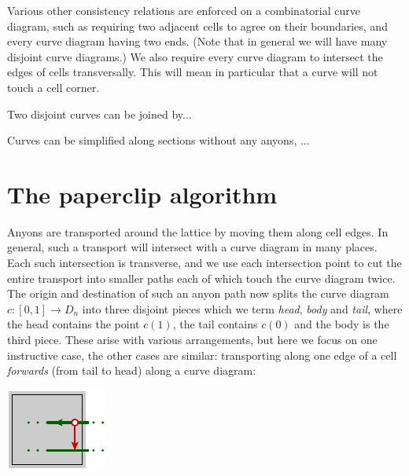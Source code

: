 \documentclass[aps, prl, letterpaper, twocolumn, superscriptaddress, notitlepage, 10pt]{revtex4-1}
\begin{document}
Various other consistency relations are enforced on a combinatorial curve diagram,
such as requiring two
adjacent cells to agree on their boundaries, and every curve diagram
having two ends.
(Note that in general we will have many disjoint curve diagrams.)
We also require every curve diagram to intersect 
the edges of cells transversally.
This will mean in particular that a curve will not touch a cell corner.

Two disjoint curves can be joined by...

Curves can be simplified along sections without any anyons, ...



\section{The paperclip algorithm}

Anyons are transported around the lattice
by moving them along cell edges.
In general, such a transport will intersect with a
curve diagram in many places.
Each such intersection is transverse,
and we use each intersection point to cut
the entire transport into smaller paths each of
which touch the curve diagram twice.
The origin and destination of such an anyon path
now splits the curve diagram $c:[0, 1]\to D_n$ 
into three disjoint pieces which we term
\emph{head}, \emph{body} and \emph{tail}, where
the head contains the point $c(1)$, the tail
contains $c(0)$ and the body is the third piece.
These arise with various arrangements, but here
we focus on one instructive case, the
other cases are similar:
transporting along one edge of a cell \emph{forwards} 
(from tail to head) along a curve diagram:
\begin{center}
\includegraphics[]{pic-move-anyon.pdf}
\end{center}
\end{document}
